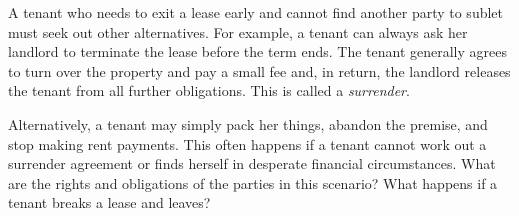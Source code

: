 A tenant who needs to exit a lease early and cannot find another party to sublet
must seek out other alternatives.  For example, a tenant can always ask her
landlord to terminate the lease before the term ends.  The tenant generally
agrees to turn over the property and pay a small fee and, in return, the
landlord releases the tenant from all further obligations. This is called a
\textit{surrender}.  

Alternatively, a tenant may simply pack her things, abandon the premise, and
stop making rent payments.  This often happens if a tenant cannot work out a
surrender agreement or finds herself in desperate financial circumstances. 
What are the rights and obligations of the parties in this scenario? What
happens if a tenant breaks a lease and leaves?  

